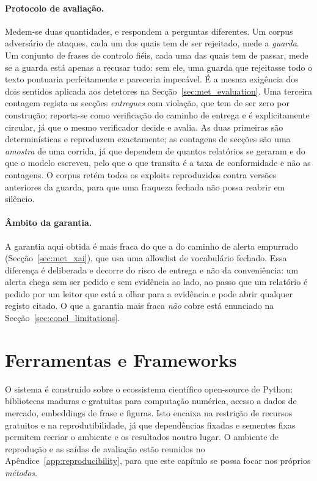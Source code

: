 \paragraph{Protocolo de avaliação.} Medem-se duas quantidades, e respondem a perguntas diferentes. Um
corpus adversário de ataques, cada um dos quais tem de ser rejeitado, mede a \emph{guarda}. Um
conjunto de frases de controlo fiéis, cada uma das quais tem de passar, mede se a guarda está apenas
a recusar tudo: sem ele, uma guarda que rejeitasse todo o texto pontuaria perfeitamente e pareceria
impecável. É a mesma exigência dos dois sentidos aplicada aos detetores na
Secção~\ref{sec:met_evaluation}. Uma terceira contagem regista as secções \emph{entregues} com
violação, que tem de ser zero por construção; reporta-se como verificação do caminho de entrega e é
explicitamente circular, já que o mesmo verificador decide e avalia. As duas primeiras são
determinísticas e reproduzem exactamente; as contagens de secções são uma \emph{amostra} de uma
corrida, já que dependem de quantos relatórios se geraram e do que o modelo escreveu, pelo que o que
transita é a taxa de conformidade e não as contagens. O corpus retém todos os exploits
reproduzidos contra versões anteriores da guarda, para que uma fraqueza fechada não possa reabrir em
silêncio.

\paragraph{Âmbito da garantia.} A garantia aqui obtida é mais fraca do que a do caminho de alerta
empurrado (Secção~\ref{sec:met_xai}), que usa uma allowlist de vocabulário fechado. Essa diferença é
deliberada e decorre do risco de entrega e não da conveniência: um alerta chega sem ser pedido e sem
evidência ao lado, ao passo que um relatório é pedido por um leitor que está a olhar para a evidência
e pode abrir qualquer registo citado. O que a garantia mais fraca \emph{não} cobre está enunciado na
Secção~\ref{sec:concl_limitations}.

\section{Ferramentas e Frameworks}
\label{sec:met_tools}

O sistema é construído sobre o ecossistema científico open-source de Python: bibliotecas maduras e gratuitas
para computação numérica, acesso a dados de mercado, embeddings de frase e figuras. Isto encaixa na
restrição de recursos gratuitos e na reprodutibilidade, já que dependências fixadas e sementes fixas
permitem recriar o ambiente e os resultados noutro lugar. O ambiente de reprodução e as saídas de avaliação
estão reunidos no Apêndice~\ref{app:reproducibility}, para que este capítulo se possa focar nos próprios
\emph{métodos}.

